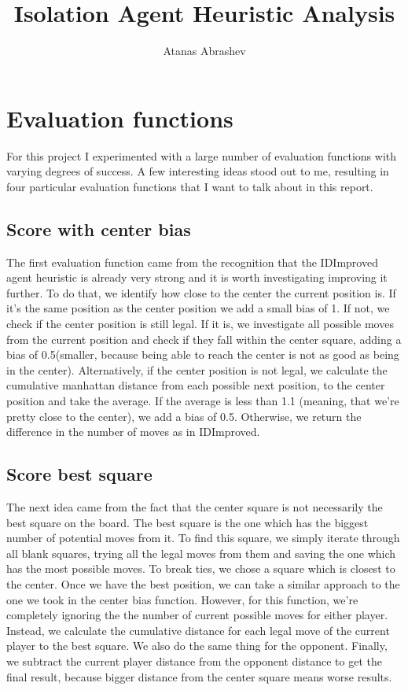 \documentclass{article}
\title{Isolation Agent Heuristic Analysis}
\author{Atanas Abrashev}
\begin{document}
\maketitle
\section{Evaluation functions}
For this project I experimented with a large number of evaluation functions with varying degrees of success. A few interesting ideas stood out to me, resulting in four particular evaluation functions that I want to talk about in this report.

\subsection{Score with center bias}
The first evaluation function came from the recognition that the IDImproved agent heuristic is already very strong and it is worth investigating improving it further. To do that, we identify how close to the center the current position is. If it's the same position as the center position we add a small bias of 1. If not, we check if the center position is still legal. If it is, we investigate all possible moves from the current position and check if they fall within the center square, adding a bias of 0.5(smaller, because being able to reach the center is not as good as being in the center). Alternatively, if the center position is not legal, we calculate the cumulative manhattan distance from each possible next position, to the center position and take the average. If the average is less than 1.1 (meaning, that we're pretty close to the center), we add a bias of 0.5. Otherwise, we return the difference in the number of moves as in IDImproved.
\subsection{Score best square}
The next idea came from the fact that the center square is not necessarily the best square on the board. The best square is the one which has the biggest number of potential moves from it. To find this square, we simply iterate through all blank squares, trying all the legal moves from them and saving the one which has the most possible moves. To break ties, we chose a square which is closest to the center. Once we have the best position, we can take a similar approach to the one we took in the center bias function. However, for this function, we're completely ignoring the the number of current possible moves for either player. Instead, we calculate the cumulative distance for each legal move of the current player to the best square. We also do the same thing for the opponent. Finally, we subtract the current player distance from the opponent distance to get the final result, because bigger distance from the center square means worse results.
\end{document}
